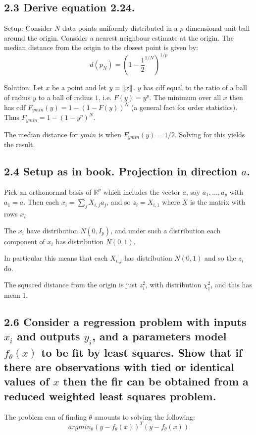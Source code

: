 \subsection*{2.3 Derive equation 2.24.}
Setup: Consider $N$ data points uniformly distributed in a $p$-dimensional unit ball around the origin. Consider a nearest neighbour estimate at the origin. The median distance from the origin to the closest point is given by:
$$ d(p_N) = \left(1 - \frac{1}{2}^{1/N}\right)^{1/p} $$

Solution: Let $x$ be a point and let $y = \left\lVert x\right\rVert$.
$y$ has cdf equal to the ratio of a ball of radius $y$ to a ball of radius $1$, i.e. $F(y) = y^p$. The minimum over all $x$ then has cdf $F_{ymin}(y) = 1 - \left(1 - F(y)\right)^N$ (a general fact for order statistics). 
Thus $F_{ymin} = 1 - \left(1 - y^p\right)^N$.

The median distance for $ymin$ is when $F_{ymin}(y) = 1/2$. Solving for this yields the result.

\subsection*{2.4 Setup as in book. Projection in direction $a$.}

Pick an orthonormal basis of $\mathbb{R}^p$ which includes the vector $a$, say $a_1, \dots, a_p$
with $a_1 = a$. Then each $x_i = \sum_j X_{i,j} a_j$, and so $z_i = X_{i,1}$ where $X$ is the matrix with rows $x_i$

The $x_i$ have distribution $N(0, I_p)$, and under such a distribution each component of $x_i$ has distribution $N(0,1)$.

In particular this means that each $X_{i,j}$ has distribution $N(0,1)$ and so the $z_i$ do.

The squared distance from the origin is just $z_i^2$, with distribution $\chi^2_1$, and this has mean 1.


\subsection*{2.6 Consider a regression problem with inputs $x_i$ and outputs $y_i$, and a parameters model $f_\theta(x)$ to be fit by least squares. Show that if there are observations with tied or identical values of $x$ then the fir can be obtained from a reduced weighted least squares problem.}

The problem can of finding $\theta$ amounts to solving the following:
$$argmin_\theta \left(y - f_\theta(x)\right)^T \left(y - f_\theta(x)\right)$$

